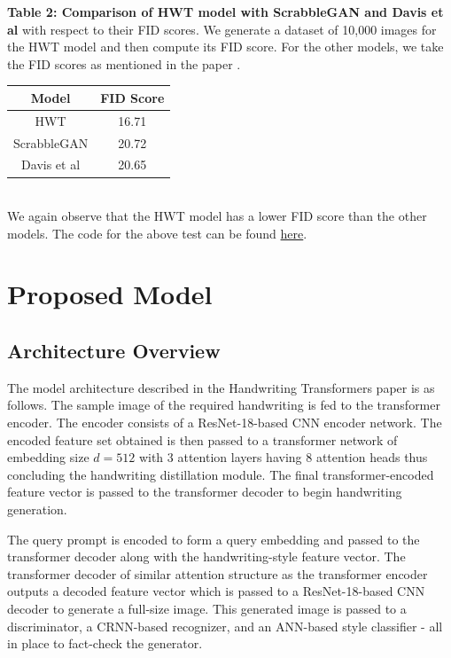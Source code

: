 \documentclass[10pt,twocolumn,letterpaper]{article}
\begin{document}
\noindent
\textbf{Table 2: Comparison of HWT model with ScrabbleGAN and Davis et al} with respect to their FID scores. We generate a dataset of 10,000 images for the HWT model and then compute its FID score. For the other models, we take the FID scores as mentioned in the paper \cite{HWT}.
\begin{table}[h]
  \begin{center}
    \begin{tabular}{|c|c|}
      \hline
      \textbf{Model} & \textbf{FID Score} \\
      \hline
      HWT & 16.71 \\
      \hline
      ScrabbleGAN & 20.72 \\
      \hline
      Davis et al & 20.65 \\
      \hline
    \end{tabular}
  \end{center}
\end{table} \\
We again observe that the HWT model has a lower FID score than the other models.
The code for the above test can be found \href{https://github.com/Shambu-K/handwriting-generator-model/blob/main/compute-fid-hwt.ipynb}{here}.

\section{Proposed Model}

\subsection{Architecture Overview}

The model architecture described in the Handwriting Transformers paper is as follows. The sample image of the required handwriting is fed to the transformer encoder. The encoder consists of a ResNet-18-based CNN encoder network. The encoded feature set obtained is then passed to a transformer network of embedding size $d = 512$ with 3 attention layers having 8 attention heads thus concluding the handwriting distillation module. The final transformer-encoded feature vector is passed to the transformer decoder to begin handwriting generation.

The query prompt is encoded to form a query embedding and passed to the transformer decoder along with the handwriting-style feature vector. The transformer decoder of similar attention structure as the transformer encoder outputs a decoded feature vector which is passed to a ResNet-18-based CNN decoder to generate a full-size image. This generated image is passed to a discriminator, a CRNN-based recognizer, and an ANN-based style classifier - all in place to fact-check the generator.
\end{document}
